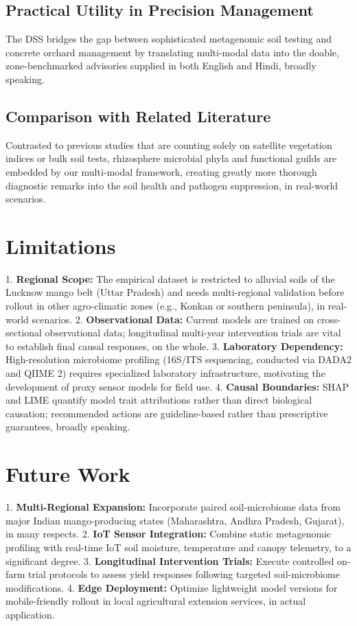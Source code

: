 \documentclass[runningheads,a4paper,oribibl]{llncs}
\begin{document}
\subsection{Practical Utility in Precision Management}
The DSS bridges the gap between sophisticated metagenomic soil testing and concrete orchard management by translating multi-modal data into the doable, zone-benchmarked advisories supplied in both English and Hindi, broadly speaking.

\subsection{Comparison with Related Literature}
Contrasted to previous studies that are counting solely on satellite vegetation indices or bulk soil tests, rhizosphere microbial phyla and functional guilds are embedded by our multi-modal framework, creating greatly more thorough diagnostic remarks into the soil health\cite{doran2000} and pathogen suppression, in real-world scenarios.


\section{Limitations}

1. \textbf{Regional Scope:} The empirical dataset is restricted to alluvial soils of the Lucknow mango belt (Uttar Pradesh) and needs multi-regional validation before rollout in other agro-climatic zones (e.g., Konkan or southern peninsula), in real-world scenarios.
2. \textbf{Observational Data:} Current models are trained on cross-sectional observational data; longitudinal multi-year intervention trials are vital to establish final causal responses, on the whole.
3. \textbf{Laboratory Dependency:} High-resolution microbiome profiling (16S/ITS sequencing, conducted via DADA2\cite{callahan2016} and QIIME 2\cite{bolyen2019}) requires specialized laboratory infrastructure, motivating the development of proxy sensor models for field use.
4. \textbf{Causal Boundaries:} SHAP and LIME quantify model trait attributions rather than direct biological causation; recommended actions are guideline-based rather than prescriptive guarantees, broadly speaking.


\section{Future Work}

1. \textbf{Multi-Regional Expansion:} Incorporate paired soil-microbiome data from major Indian mango-producing states (Maharashtra, Andhra Pradesh, Gujarat), in many respects.
2. \textbf{IoT Sensor Integration:} Combine static metagenomic profiling with real-time IoT soil moisture, temperature and canopy telemetry, to a significant degree.
3. \textbf{Longitudinal Intervention Trials:} Execute controlled on-farm trial protocols to assess yield responses following targeted soil-microbiome modifications.
4. \textbf{Edge Deployment:} Optimize lightweight model versions for mobile-friendly rollout in local agricultural extension services, in actual application.
\end{document}
